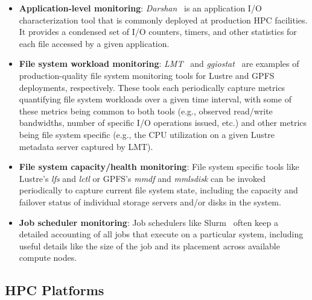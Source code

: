 \begin{itemize}[leftmargin=*]
\item \textbf{Application-level monitoring}: \textit{Darshan}~\cite{Carns2009} is an application I/O characterization tool that is commonly deployed at production HPC facilities. It provides a condensed set of I/O counters, timers, and other statistics for each file accessed by a given application.

\item \textbf{File system workload monitoring}: \textit{LMT}~\cite{lmt} and \textit{ggiostat}~\cite{Lockwood2017} are examples of 
production-quality file system monitoring tools for Lustre and GPFS deployments, respectively. These tools each periodically capture metrics quantifying file system workloads over a given time interval, with some of these metrics being common to both tools (e.g., observed read/write bandwidths, number of specific I/O operations issued, etc.) and other metrics being file system specific (e.g., the CPU utilization on a given Lustre metadata server captured by LMT).

\item \textbf{File system capacity/health monitoring}: File system specific tools like Lustre's \textit{lfs} and \textit{lctl} or GPFS's \textit{mmdf} and \textit{mmlsdisk} can be invoked periodically to capture current file system state, including the capacity and failover status of individual storage servers and/or disks in the system.

\item \textbf{Job scheduler monitoring}: Job schedulers like Slurm~\cite{2003slurm} often keep a detailed accounting of all jobs that execute on a particular system, including useful details like the size of the job and its placement across available compute nodes.
\end{itemize}


\subsection{HPC Platforms}\label{sec:methods/platforms}

